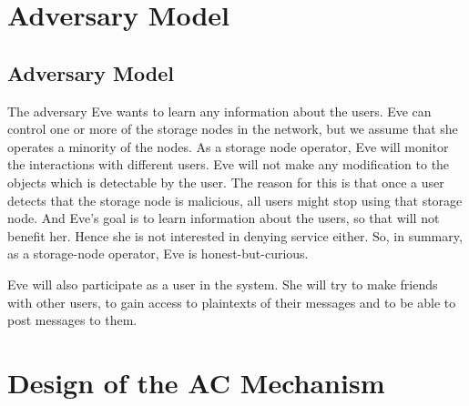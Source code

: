\section<article>{Adversary Model}\label{sec:Adversary}
\subsection<presentation>{Adversary Model}


The adversary Eve wants to learn any information about the users.
Eve can control one or more of the storage nodes in the network, but we assume 
that she operates a minority of the nodes.
As a storage node operator, Eve will monitor the interactions with different 
users.
Eve will not make any modification to the objects which is detectable by the 
user.
The reason for this is that once a user detects that the storage node is 
malicious, all users might stop using that storage node.
And Eve's goal is to learn information about the users, so that will not 
benefit her.
Hence she is not interested in denying service either.
So, in summary, as a storage-node operator, Eve is honest-but-curious.

Eve will also participate as a user in the system.
She will try to make friends with other users, to gain access to plaintexts of 
their messages and to be able to post messages to them.


\section[Scheme Design]{Design of the \acl{AC} Mechanism}\label{sec:Design}

